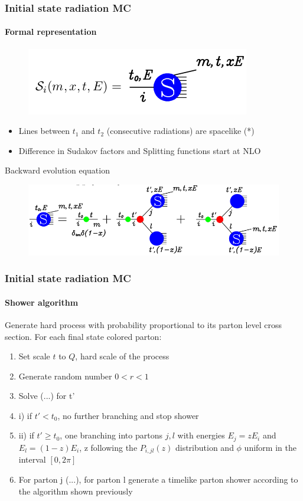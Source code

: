 \documentclass[aspectratio=43]{beamer}
\begin{document}
\begin{frame}
	
	\frametitle{Initial state radiation MC}
	\framesubtitle{Formal representation}
	
	\begin{figure}
		\includegraphics[width = 3 cm]{plots/shower_ISR_2.png}
	\end{figure}
	
	\begin{itemize} 
		\item Lines between $t_{1}$ and $t_{2}$ (consecutive radiations) are spacelike {\color{blue}(*)}
		\item Difference in Sudakov factors and Splitting functions start at NLO
	\end{itemize}
	
	Backward evolution equation
	\begin{figure}
		\includegraphics[width = 10 cm]{plots/shower_ISR_3.png}
	\end{figure}

\end{frame}

\begin{frame}

	\frametitle{Initial state radiation MC}
	\framesubtitle{Shower algorithm}
	
	Generate hard process with probability proportional to its parton level cross section. For each final state colored parton:
	\begin{enumerate} 
		\item Set scale $t$ to $Q$, hard scale of the process
		\item Generate random number $0 < r < 1$
		\item Solve (...) for t'
		\item i) if $t' < t_{0}$, no further branching and stop shower
		\item ii) if $t' \geq t_{0}$, one branching into partons $j, l$ with energies $E_{j} = zE_{i}$ and $E_{l} = (1 - z)E_{i}$, z following the $P_{i, jl}(z)$ distribution and $\phi$ uniform in the interval $[0, 2\pi]$
		\item For parton j (...), for parton l generate a timelike parton shower according to the algorithm shown previously
	\end{enumerate}

\end{frame}
\end{document}
